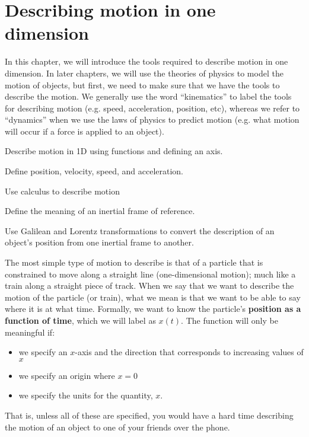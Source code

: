 %
\chapter{Describing motion in one dimension}
\label{chap:3_Kinematics1D}
In this chapter, we will introduce the tools required to describe motion in one dimension. In later chapters, we will use the theories of physics to model the motion of objects, but first, we need to make sure that we have the tools to describe the motion. We generally use the word ``kinematics'' to label the tools for describing motion (e.g. speed, acceleration, position, etc), whereas we refer to ``dynamics'' when we use the laws of physics to predict motion (e.g. what motion will occur if a force is applied to an object). 
 \vspace{1cm}
\begin{learningObjectives}
\item Describe motion in 1D using functions and defining an axis.
\item Define position, velocity, speed, and acceleration.
\item Use calculus to describe motion
\item Define the meaning of an inertial frame of reference.
\item Use Galilean and Lorentz transformations to convert the description of an object's position from one inertial frame to another.
\end{learningObjectives}


The most simple type of motion to describe is that of a particle that is constrained to move along a straight line (one-dimensional motion); much like a train along a straight piece of track. When we say that we want to describe the motion of the particle (or train), what we mean is that we want to be able to say where it is at what time. Formally, we want to know the particle's \textbf{position as a function of time}, which we will label as $x(t)$. The function will only be meaningful if:
\begin{itemize}
\item we specify an $x$-axis and the direction that corresponds to increasing values of $x$
\item we specify an origin where $x=0$
\item we specify the units for the quantity, $x$.
\end{itemize}
That is, unless all of these are specified, you would have a hard time describing the motion of an object to one of your friends over the phone. 

